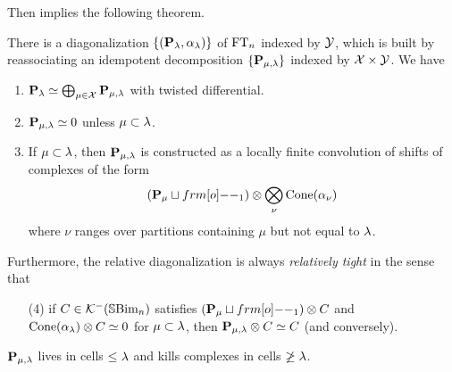 Then \cite[Theorem 8.2 and following remarks]{ElHog17a} implies the following theorem.

\begin{theorem} \label{thm:relDiag1less} There is a diagonalization $\{({\mathbf P}_\lambda, \alpha_\lambda)\}$ of $\operatorname{FT}_n$ indexed by ${\mathcal{Y}}$, which is built by reassociating an idempotent decomposition $\{{\mathbf P}_{\mu,\lambda}\}$ indexed by ${\mathcal{X}} \times {\mathcal{Y}}$. We have
\begin{enumerate}\setlength{\itemsep}{2pt}
\item ${\mathbf P}_\lambda \simeq \bigoplus_{\mu \in {\mathcal{X}}} {\mathbf P}_{\mu,\lambda}$ with twisted differential.
\item ${\mathbf P}_{\mu,\lambda}\simeq 0$ unless $\mu\subset \lambda$.
\item If $\mu\subset \lambda$, then ${\mathbf P}_{\mu,\lambda}$ is constructed as a locally finite convolution of shifts of complexes of the form
\begin{equation} \label{eq:doubleidemp}
(\PB_{\mu}\sqcup \one_1)\otimes \bigotimes_{\nu}\Cone(\a_\nu)
\end{equation}
where $\nu$ ranges over partitions containing $\mu$ but not equal to $\lambda$.
\end{enumerate}
Furthermore, the relative diagonalization is always \emph{relatively tight} in the sense that
\begin{enumerate}
\item[(4)] if $C\in {\mathcal{K}}^-({\mathbb{S}}{\rm Bim }_n)$ satisfies $(\PB_{\mu}\sqcup \one_1)\otimes C$ and $\operatorname{Cone}(\alpha_\lambda)\otimes C\simeq 0$ for $\mu\subset \lambda$, then ${\mathbf P}_{\mu,\lambda}\otimes C\simeq C$ (and conversely).
\end{enumerate}
\end{theorem}

\begin{lemma} \label{lem:doubleidempcell}
${\mathbf P}_{\mu,\lambda}$ lives in cells $\leq \lambda$ and kills complexes in cells $\not\geq \lambda$.
\end{lemma}

